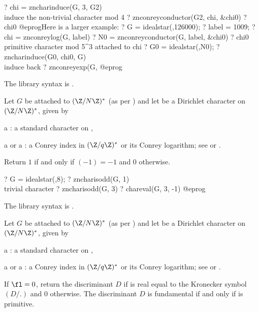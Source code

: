 ? chi = zncharinduce(G, 3, G2)  \\ induce the non-trivial character mod 4
? znconreyconductor(G2, chi, &chi0)
? chi0
@eprog\noindent Here is a larger example:
\bprog
? G = idealstar(,126000);
? label = 1009;
? chi = znconreylog(G, label)
? N0 = znconreyconductor(G, label, &chi0)
? chi0 \\ primitive character mod 5^3 attached to chi
? G0 = idealstar(,N0);
? zncharinduce(G0, chi0, G) \\ induce back
? znconreyexp(G, %
@eprog

The library syntax is .

\label{se:zncharisodd}
Let $G$ be attached to $(\Z/N\Z)^*$ (as per )
and let  be a Dirichlet character on $(\Z/N\Z)^*$, given by

\item a : a standard character on ,

\item a  or a : a Conrey index in $(\Z/q\Z)^*$ or its
Conrey logarithm;
see  or .

Return $1$ if and only if $(-1) = -1$ and $0$ otherwise.

\bprog
? G = idealstar(,8);
? zncharisodd(G, 1)  \\ trivial character
? zncharisodd(G, 3)
? chareval(G, 3, -1)
@eprog

The library syntax is .

\label{se:znchartokronecker}
Let $G$ be attached to $(\Z/N\Z)^*$ (as per )
and let  be a Dirichlet character on $(\Z/N\Z)^*$, given by

\item a : a standard character on ,

\item a  or a : a Conrey index in $(\Z/q\Z)^*$ or its
Conrey logarithm;
see  or .

If $\fl = 0$, return the discriminant $D$ if  is real equal to the
Kronecker symbol $(D/.)$ and $0$ otherwise. The discriminant $D$ is
fundamental if and only if  is primitive.

